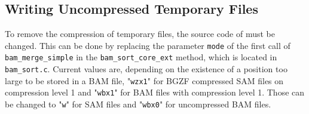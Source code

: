 \subsection{Writing Uncompressed Temporary Files}\label{changeSource}

To remove the compression of temporary files, the source code of \sort must be changed.  
This can be done by replacing the parameter \texttt{mode} of the first call of \texttt{bam\_merge\_simple} in the \texttt{bam\_sort\_core\_ext} method, which is located in \texttt{bam\_sort.c}. Current values are, depending on the existence of a position too large to be stored in a BAM file, "\texttt{wzx1}" for BGZF compressed SAM files on compression level 1 and "\texttt{wbx1}" for BAM files with compression level 1. Those can be changed to "\texttt{w}" for SAM files and "\texttt{wbx0}" for uncompressed BAM files.





\newpage